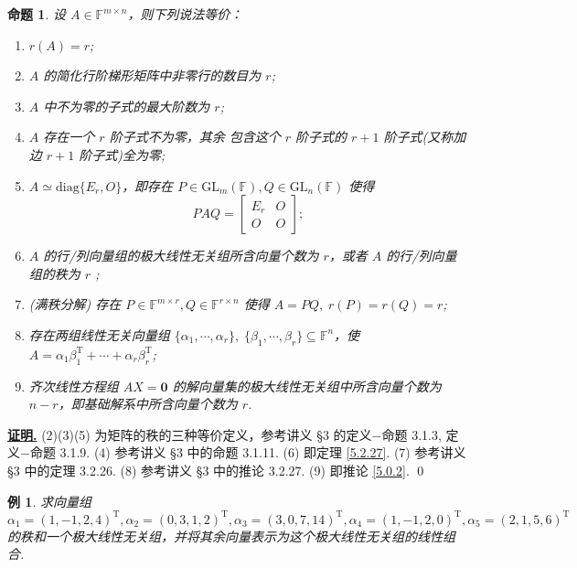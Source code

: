 \documentclass[10pt,openany]{article}
\theoremstyle{thmstyle} %
\theoremstyle{defstyle} %
\theoremstyle{prostyle} %
\newtheorem{proposition}[theorem]{命题}
\theoremstyle{exastyle}
\newtheorem{example}[theorem]{例}
\theoremstyle{remstyle}
\renewenvironment{proof}[1][证明]{\par\underline{\textbf{#1.}} \;\fangsong}{\qed\par}
\newcommand{\T}{^{\text{T}}}
\newcommand{\F}{\mathbb{F}}
\newcommand{\gfn}{\text{GL}_n(\mathbb{F})}
\newcommand{\gfm}{\text{GL}_m(\mathbb{F})}
\newcommand{\mn}{^{m \times n}}
\newcommand{\diag}{\mathrm{diag}}
\begin{document}
\begin{proposition} \label{5.2.29}
	设 \( A \in \F\mn \)，则下列说法等价：
	\begin{enumerate}[(1)]
		\item \( r(A)=r \);
		\item \( A \) 的简化行阶梯形矩阵中非零行的数目为 \( r \);
		\item \( A \) 中不为零的子式的最大阶数为 \( r \);
		\item \( A \) 存在一个 \( r \) 阶子式不为零，其余{\color{red} 包含这个 \( r \) 阶子式}的 \( r+1 \) 阶子式(又称加边 \( r+1 \) 阶子式)全为零;
		\item \( A \simeq \diag\{E_r,O\} \)，即存在 \( P \in \gfm, Q \in \gfn \) 使得
		\[ PAQ=\begin{bmatrix}
			E_r & O \\ O & O
		\end{bmatrix}; \]
		\item \( A \) 的行/列向量组的极大线性无关组所含向量个数为 \( r \)，或者 \( A \) 的行/列向量组的秩为 \( r \) ;
		\item (满秩分解) 存在 \( P \in \F^{m \times r}, Q \in \F^{r \times n} \) 使得 \( A=PQ, \; r(P)=r(Q)=r \);
		\item 存在两组线性无关向量组 \( \{\alpha_1,\cdots,\alpha_r\}, \; \{\beta_1,\cdots,\beta_r\} \subseteq \F^n \)，使 \( A=\alpha_1\beta_1\T+\cdots+\alpha_r\beta_r\T \);
		\item 齐次线性方程组 \( AX=\bm{0} \) 的解向量集的极大线性无关组中所含向量个数为 \( n-r \)，即基础解系中所含向量个数为 \( r \).
	\end{enumerate}
\end{proposition}

\begin{proof}
	(2)(3)(5) 为矩阵的秩的三种等价定义，参考讲义 \S 3 的定义\(-\)命题 3.1.3, 定义\(-\)命题 3.1.9. (4) 参考讲义 \S 3 中的命题 3.1.11. (6) 即定理 \ref{5.2.27}. (7) 参考讲义 \S 3 中的定理 3.2.26. (8) 参考讲义 \S 3 中的推论 3.2.27. (9) 即推论 \ref{5.0.2}.
\end{proof}

\begin{example}
	求向量组 \( \alpha_1=(1,-1,2,4)\T, \alpha_2=(0,3,1,2)\T, \alpha_3=(3,0,7,14)\T, \alpha_4=(1,-1,2,0)\T, \alpha_5=(2,1,5,6)\T \) 的秩和一个极大线性无关组，并将其余向量表示为这个极大线性无关组的线性组合.
\end{example}
\end{document}
